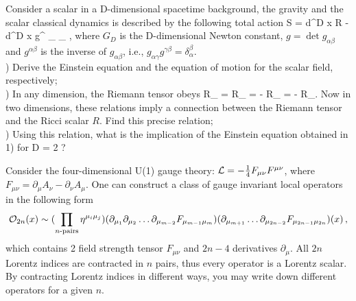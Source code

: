 \vspace{4mm}
\renewcommand{\a}{\alpha}
\renewcommand{\b}{\beta}
\renewcommand{\c}{\gamma}
\renewcommand{\d}{\delta}
\topmargin 0pt \oddsidemargin 0mm
{\small
{}
Consider a scalar in a D-dimensional spacetime background, the gravity and the scalar classical dynamics is described by the following total action
\be\label{ta}
S =  \int d^{D} x  R -  \int d^{D} x  g^{\alpha\beta} \partial_{\alpha} \phi \partial_{\beta} \phi,
\ee
where $G_{D}$ is the D-dimensional Newton constant,  $g = \det g_{\alpha\beta}$ and $g^{\alpha\beta}$ is the inverse of $g_{\alpha\beta}$, i.e., $g_{\alpha\gamma} g^{\gamma\beta} = \delta_{\alpha}^{\beta}$.\\
\noindent
{})  Derive the Einstein equation and the equation of motion for the scalar field, respectively;\\
) In any dimension, the Riemann tensor obeys
\be
R_{\alpha\beta\gamma\delta} = R_{\gamma\delta\alpha\beta} =  - R_{\beta\alpha\gamma\delta} = - R_{\alpha\beta\delta\gamma}.
\ee
Now in two dimensions, these relations imply a connection between the Riemann tensor and the Ricci scalar $R$. Find this precise relation;\\
) Using this relation, what is the implication of  the Einstein equation obtained in 1) for D = 2 ? 

\medskip
{}
Consider the four-dimensional U(1) gauge theory: ${\cal L}= -{1\over4} F_{\mu\nu} F^{\mu\nu}$, where $F_{\mu\nu} = \partial_\mu A_\nu - \partial_\nu A_\mu$. One can construct a class of gauge invariant local operators in the following form
\begin{equation}
{\cal O}_{2n}(x) \sim (\prod_{n\textrm{-pairs}} \eta^{\mu_i \mu_j} ) (\partial_{\mu_1} \partial_{\mu_2} \ldots \partial_{\mu_{m-2}}F_{\mu_{m-1} \mu_{m}}) (\partial_{\mu_{m+1}} \ldots \partial_{\mu_{2n-2}}  F_{\mu_{2n-1}\mu_{2n}})(x) \,, \nonumber
\end{equation}
which contains 2 field strength tensor $F_{\mu\nu}$ and $2n-4$ derivatives $\partial_\mu$. All $2n$ Lorentz indices are contracted in $n$ pairs, thus every operator is a Lorentz scalar.
By contracting Lorentz indices in different ways, you may write down different operators for a given $n$.\\

}
